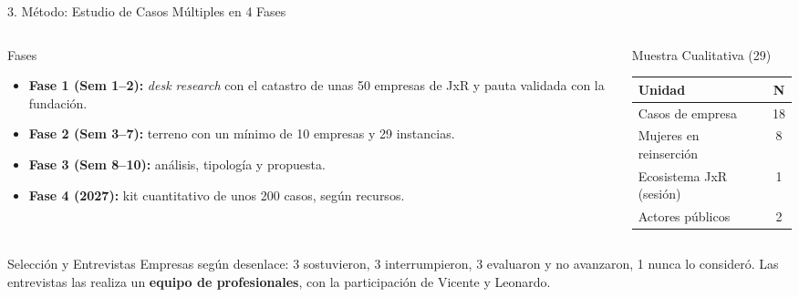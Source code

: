 \documentclass[aspectratio=169, 10pt]{beamer}
\begin{document}
\begin{frame}{3. Método: Estudio de Casos Múltiples en 4 Fases}
  \begin{columns}[T]
    \begin{column}{0.54\textwidth}
      \begin{block}{Fases}
        \small
        \begin{itemize}
          \item \textbf{Fase 1 (Sem 1--2):} \textit{desk research} con el catastro de unas 50 empresas de JxR y pauta validada con la fundación.
          \item \textbf{Fase 2 (Sem 3--7):} terreno con un mínimo de 10 empresas y 29 instancias.
          \item \textbf{Fase 3 (Sem 8--10):} análisis, tipología y propuesta.
          \item \textbf{Fase 4 (2027):} kit cuantitativo de unos 200 casos, según recursos.
        \end{itemize}
      \end{block}
    \end{column}
    \begin{column}{0.42\textwidth}
      \begin{block}{Muestra Cualitativa (29)}
        \small
        \begin{tabular}{l c}
          \toprule
          \textbf{Unidad} & \textbf{N} \\
          \midrule
          Casos de empresa & 18 \\
          Mujeres en reinserción & 8 \\
          Ecosistema JxR (sesión) & 1 \\
          Actores públicos & 2 \\
          \bottomrule
        \end{tabular}
      \end{block}
    \end{column}
  \end{columns}

  \begin{block}{Selección y Entrevistas}
    \small Empresas según desenlace: 3 sostuvieron, 3 interrumpieron, 3 evaluaron y no avanzaron, 1 nunca lo consideró. Las entrevistas las realiza un \textbf{equipo de profesionales}, con la participación de Vicente y Leonardo.
  \end{block}
\end{frame}
\end{document}
